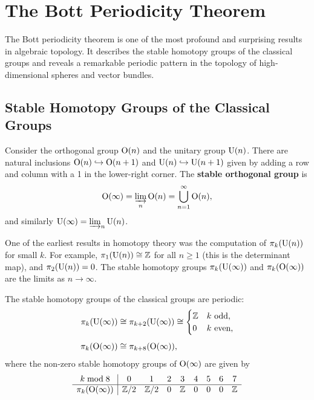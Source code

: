 \section{The Bott Periodicity Theorem}

The Bott periodicity theorem is one of the most profound and surprising results in algebraic topology. It describes the stable homotopy groups of the classical groups and reveals a remarkable periodic pattern in the topology of high-dimensional spheres and vector bundles.

\subsection{Stable Homotopy Groups of the Classical Groups}

Consider the orthogonal group \(\operatorname{O}(n)\) and the unitary group \(\operatorname{U}(n)\). There are natural inclusions \(\operatorname{O}(n) \hookrightarrow \operatorname{O}(n+1)\) and \(\operatorname{U}(n) \hookrightarrow \operatorname{U}(n+1)\) given by adding a row and column with a 1 in the lower-right corner. The \textbf{stable orthogonal group} is
\[
\operatorname{O}(\infty) = \varinjlim_n \operatorname{O}(n) = \bigcup_{n=1}^\infty \operatorname{O}(n),
\]
and similarly \(\operatorname{U}(\infty) = \varinjlim_n \operatorname{U}(n)\).

One of the earliest results in homotopy theory was the computation of \(\pi_k(\operatorname{U}(n))\) for small \(k\). For example, \(\pi_1(\operatorname{U}(n)) \cong \mathbb{Z}\) for all \(n \geq 1\) (this is the determinant map), and \(\pi_2(\operatorname{U}(n)) = 0\). The stable homotopy groups \(\pi_k(\operatorname{U}(\infty))\) and \(\pi_k(\operatorname{O}(\infty))\) are the limits as \(n \to \infty\).

\begin{theorem}
The stable homotopy groups of the classical groups are periodic:
\begin{align*}
\pi_k(\operatorname{U}(\infty)) &\cong \pi_{k+2}(\operatorname{U}(\infty)) \cong 
\begin{cases}
\mathbb{Z} & k \text{ odd},\\
0 & k \text{ even},
\end{cases}\\[4pt]
\pi_k(\operatorname{O}(\infty)) &\cong \pi_{k+8}(\operatorname{O}(\infty)),
\end{align*}
where the non-zero stable homotopy groups of \(\operatorname{O}(\infty)\) are given by
\[
\begin{array}{c|cccccccc}
k \bmod 8 & 0 & 1 & 2 & 3 & 4 & 5 & 6 & 7 \\ \hline
\pi_k(\operatorname{O}(\infty)) & \mathbb{Z}/2 & \mathbb{Z}/2 & 0 & \mathbb{Z} & 0 & 0 & 0 & \mathbb{Z}
\end{array}
\]
\end{theorem}

